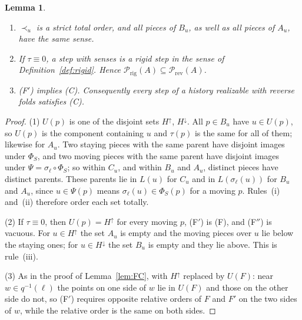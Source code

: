 \documentclass[11pt]{amsart}
\newtheorem{lemma}[theorem]{Lemma}
\theoremstyle{definition}
\theoremstyle{remark}
\newcommand{\Prig}{\mathcal{P}_{\mathrm{rig}}}
\newcommand{\Prev}{\mathcal{P}_{\mathrm{rev}}}
\newcommand{\up}{H^{\uparrow}}
\newcommand{\down}{H^{\downarrow}}
\begin{document}
\begin{lemma}\label{lem:senses}\leavevmode
\begin{enumerate}[label=(\arabic*)]
\item $\prec_u$ is a strict total order, and all pieces of $B_u$, as well as all pieces of $A_u$, have
the same sense.
\item If $\tau\equiv0$, a step with senses is a rigid step in the sense of
Definition~\ref{def:rigid}. Hence $\Prig(A)\subseteq\Prev(A)$.
\item (F$'$) implies (C). Consequently every step of a history realizable with reverse folds
satisfies (C).
\end{enumerate}
\end{lemma}
\begin{proof}
(1) $U(p)$ is one of the disjoint sets $\up$, $\down$. All $p\in B_u$ have $u\in U(p)$, so $U(p)$ is
the component containing $u$ and $\tau(p)$ is the same for all of them; likewise for $A_u$. Two
staying pieces with the same parent have disjoint images under $\Phi_S$, and two moving pieces with
the same parent have disjoint images under $\Psi=\sigma_\ell\circ\Phi_S$; so within $C_u$, and
within $B_u$ and $A_u$, distinct pieces have distinct parents. These parents lie in $L(u)$ for $C_u$
and in $L(\sigma_\ell(u))$ for $B_u$ and $A_u$, since $u\in\Psi(p)$ means $\sigma_\ell(u)\in\Phi_S(p)$
for a moving $p$. Rules~(i) and~(ii) therefore order each set totally.

(2) If $\tau\equiv0$, then $U(p)=\up$ for every moving $p$, (F$'$) is (F), and (F$''$) is vacuous.
For $u\in\up$ the set $A_u$ is empty and the moving pieces over $u$ lie below the staying ones; for
$u\in\down$ the set $B_u$ is empty and they lie above. This is rule~(iii).

(3) As in the proof of Lemma~\ref{lem:FC}, with $\up$ replaced by $U(F)$: near
$w\in q^{-1}(\ell)$ the points on one side of $w$ lie in $U(F)$ and those on the other side do not,
so (F$'$) requires opposite relative orders of $F$ and $F'$ on the two sides of $w$, while the
relative order is the same on both sides.
\end{proof}
\end{document}
